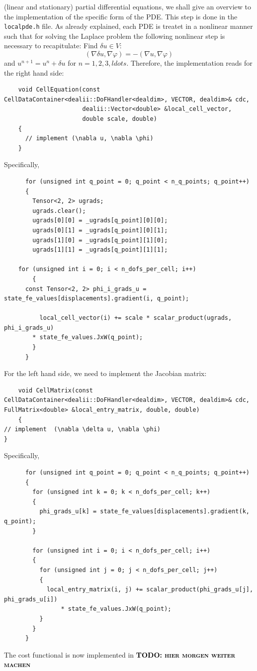 \documentclass[prodmode,acmtoms]{acmsmall}
\numberwithin{equation}{section}
\renewcommand{\phi}{\varphi}
\newcommand{\todo}[1]{\textbf{\textsc{\textcolor{black}{TODO: #1}}}}
\begin{document}
(linear and stationary) partial differential equations, we shall give 
an overview to the implementation of the specific form of the PDE. 
This step is done in the \texttt{localpde.h} file. As already explained,
each PDE is treatet in a nonlinear manner such that for solving 
the Laplace problem the following nonlinear step is necessary to recapitulate:
Find $\delta u\in V$:
\[
(\nabla \delta u, \nabla \phi) = -(\nabla u, \nabla \phi) 
\]
and $u^{n+1} = u^n + \delta u$ for $n=1,2,3,ldots$.
Therefore, the implementation reads for the right hand side:
\begin{lstlisting}
    void CellEquation(const CellDataContainer<dealii::DoFHandler<dealdim>, VECTOR, dealdim>& cdc,
                      dealii::Vector<double> &local_cell_vector,
                      double scale, double)
    {
      // implement (\nabla u, \nabla \phi) 
    }
\end{lstlisting}
Specifically,
\begin{lstlisting}
      for (unsigned int q_point = 0; q_point < n_q_points; q_point++)
      {
        Tensor<2, 2> ugrads;
        ugrads.clear();
        ugrads[0][0] = _ugrads[q_point][0][0];
        ugrads[0][1] = _ugrads[q_point][0][1];
        ugrads[1][0] = _ugrads[q_point][1][0];
        ugrads[1][1] = _ugrads[q_point][1][1];

	for (unsigned int i = 0; i < n_dofs_per_cell; i++)
        {
	  const Tensor<2, 2> phi_i_grads_u = state_fe_values[displacements].gradient(i, q_point);

          local_cell_vector(i) += scale * scalar_product(ugrads, phi_i_grads_u) 
	    * state_fe_values.JxW(q_point);
        }
      }
\end{lstlisting}
For the left hand side, we need to implement the Jacobian matrix:
\begin{lstlisting}
    void CellMatrix(const CellDataContainer<dealii::DoFHandler<dealdim>, VECTOR, dealdim>& cdc, FullMatrix<double> &local_entry_matrix, double, double)
    {
// implement  (\nabla \delta u, \nabla \phi)
}
\end{lstlisting}
Specifically,
\begin{lstlisting}
      for (unsigned int q_point = 0; q_point < n_q_points; q_point++)
      {
        for (unsigned int k = 0; k < n_dofs_per_cell; k++)
        {
          phi_grads_u[k] = state_fe_values[displacements].gradient(k, q_point);
        }

        for (unsigned int i = 0; i < n_dofs_per_cell; i++)
        {
          for (unsigned int j = 0; j < n_dofs_per_cell; j++)
          {
            local_entry_matrix(i, j) += scalar_product(phi_grads_u[j], phi_grads_u[i]) 
                * state_fe_values.JxW(q_point);
          }
        }
      }
\end{lstlisting}
The cost functional is now implemented in \todo{hier morgen weiter machen}
\end{document}
